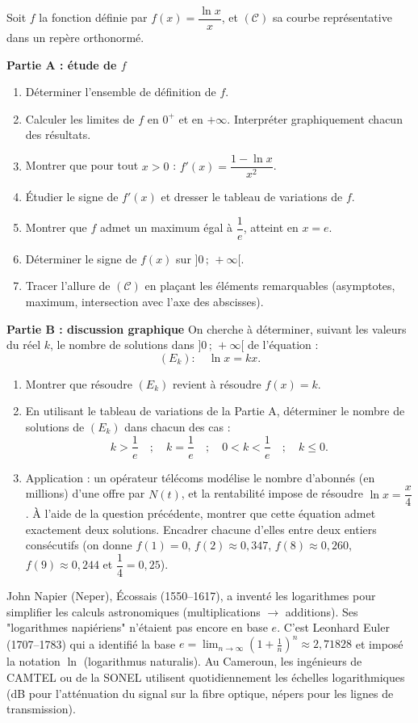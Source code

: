 \documentclass[11pt]{article}
\begin{document}
\begin{exercice}
Soit $f$ la fonction définie par $f(x)=\dfrac{\ln x}{x}$, et $(\mathcal{C})$ sa courbe représentative dans un repère orthonormé.

\textbf{Partie A : étude de $f$}
\begin{enumerate}
\item Déterminer l'ensemble de définition de $f$.
\item Calculer les limites de $f$ en $0^+$ et en $+\infty$. Interpréter graphiquement chacun des résultats.
\item Montrer que pour tout $x>0$ : $f'(x)=\dfrac{1-\ln x}{x^2}$.
\item Étudier le signe de $f'(x)$ et dresser le tableau de variations de $f$.
\item Montrer que $f$ admet un maximum égal à $\dfrac{1}{e}$, atteint en $x=e$.
\item Déterminer le signe de $f(x)$ sur $]0\,;\,+\infty[$.
\item Tracer l'allure de $(\mathcal{C})$ en plaçant les éléments remarquables (asymptotes, maximum, intersection avec l'axe des abscisses).
\end{enumerate}

\textbf{Partie B : discussion graphique}
On cherche à déterminer, suivant les valeurs du réel $k$, le nombre de solutions dans $]0\,;\,+\infty[$ de l'équation :
\[ (E_k):\quad \ln x = kx. \]
\begin{enumerate}
\item Montrer que résoudre $(E_k)$ revient à résoudre $f(x)=k$.
\item En utilisant le tableau de variations de la Partie A, déterminer le nombre de solutions de $(E_k)$ dans chacun des cas :
\[ k>\dfrac{1}{e}\quad ;\quad k=\dfrac{1}{e}\quad ;\quad 0<k<\dfrac{1}{e}\quad ;\quad k\leq 0. \]
\item Application : un opérateur télécoms modélise le nombre d'abonnés (en millions) d'une offre par $N(t)$, et la rentabilité impose de résoudre $\ln x = \dfrac{x}{4}$. À l'aide de la question précédente, montrer que cette équation admet exactement deux solutions. Encadrer chacune d'elles entre deux entiers consécutifs (on donne $f(1)=0$, $f(2)\approx 0,347$, $f(8)\approx 0,260$, $f(9)\approx 0,244$ et $\dfrac{1}{4}=0,25$).
\end{enumerate}
\end{exercice}

\begin{savaistu}
John Napier (Neper), Écossais (1550--1617), a inventé les logarithmes pour simplifier les calculs astronomiques (multiplications $\to$ additions). Ses "logarithmes napiériens" n'étaient pas encore en base $e$. C'est Leonhard Euler (1707--1783) qui a identifié la base $e = \lim_{n\to\infty}(1+\frac{1}{n})^n \approx 2,71828$ et imposé la notation $\ln$ (logarithmus naturalis). Au Cameroun, les ingénieurs de CAMTEL ou de la SONEL utilisent quotidiennement les échelles logarithmiques (dB pour l'atténuation du signal sur la fibre optique, népers pour les lignes de transmission).
\end{savaistu}
\end{document}
